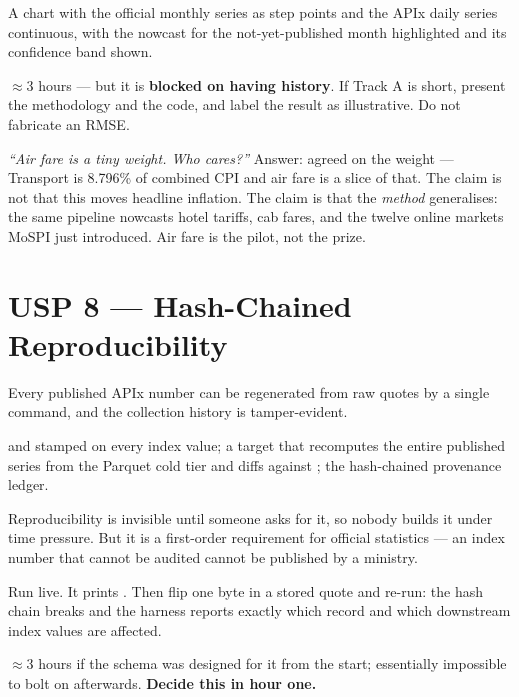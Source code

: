  A chart with the official monthly series as step points and the APIx
daily series continuous, with the nowcast for the not-yet-published month highlighted and
its confidence band shown.

 $\approx$3 hours --- but it is \textbf{blocked on having history}. If
Track A is short, present the methodology and the code, and label the result as
illustrative. Do not fabricate an RMSE.

 \emph{``Air fare is a tiny weight. Who cares?''} Answer: agreed
on the weight --- Transport is 8.796\% of combined CPI and air fare is a slice of that. The
claim is not that this moves headline inflation. The claim is that the \emph{method}
generalises: the same pipeline nowcasts hotel tariffs, cab fares, and the twelve online
markets MoSPI just introduced. Air fare is the pilot, not the prize.

\section{USP 8 --- Hash-Chained Reproducibility}

\begin{uspbox}
 Every published APIx number can be regenerated from raw quotes by a single
command, and the collection history is tamper-evident.
\end{uspbox}

  and  stamped on every index
value; a  target that recomputes the entire published series from the
Parquet cold tier and diffs against ; the hash-chained provenance
ledger.

 Reproducibility is invisible until someone asks for it,
so nobody builds it under time pressure. But it is a first-order requirement for official
statistics --- an index number that cannot be audited cannot be published by a ministry.

 Run  live. It prints . Then flip one byte in a stored quote and re-run: the hash chain breaks and
the harness reports exactly which record and which downstream index values are affected.

 $\approx$3 hours if the schema was designed for it from the start;
essentially impossible to bolt on afterwards. \textbf{Decide this in hour one.}

